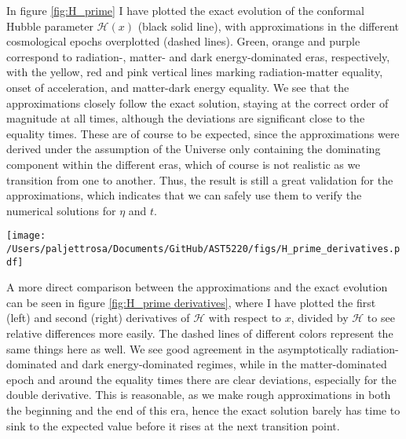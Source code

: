 \documentclass{aa}
\numberwithin{equation}{section}
\numberwithin{table}{section}
\numberwithin{figure}{section}
\begin{document}
In figure \ref{fig:H_prime} I have plotted the exact evolution of the conformal Hubble parameter $\mathcal{H}(x)$ (black solid line), with approximations in the different cosmological epochs overplotted (dashed lines). Green, orange and purple correspond to radiation-, matter- and dark energy-dominated eras, respectively, with the yellow, red and pink vertical lines marking radiation-matter equality, onset of acceleration, and matter-dark energy equality. We see that the approximations closely follow the exact solution, staying at the correct order of magnitude at all times, although the deviations are significant close to the equality times. These are of course to be expected, since the approximations were derived under the assumption of the Universe only containing the dominating component within the different eras, which of course is not realistic as we transition from one to another. Thus, the result is still a great validation for the approximations, which indicates that we can safely use them to verify the numerical solutions for $\eta$ and $t$.

\begin{figure*}
    \centering
    \texttt{[image: /Users/paljettrosa/Documents/GitHub/AST5220/figs/H\_prime\_derivatives.pdf]}
    \caption{Comparison of exact evolutions (black) with approximations (dashed) for the scaled first and second derivatives of $\mathcal{H}(x)$. Agreement is good in pure radiation and matter domination but deviates near transitions due to neglected components.}\label{fig:H_prime derivatives}
\end{figure*}

A more direct comparison between the approximations and the exact evolution can be seen in figure \ref{fig:H_prime derivatives}, where I have plotted the first (left) and second (right) derivatives of $\mathcal{H}$ with respect to $x$, divided by $\mathcal{H}$ to see relative differences more easily. The dashed lines of different colors represent the same things here as well. We see good agreement in the asymptotically radiation-dominated and dark energy-dominated regimes, while in the matter-dominated epoch and around the equality times there are clear deviations, especially for the double derivative. This is reasonable, as we make rough approximations in both the beginning and the end of this era, hence the exact solution barely has time to sink to the expected value before it rises at the next transition point. 
\end{document}
